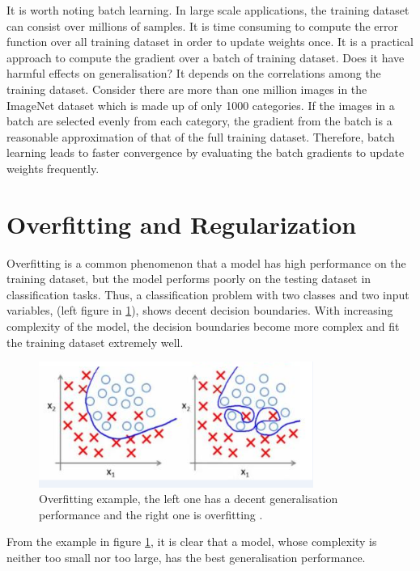 It is worth noting batch learning. In large scale applications, the training dataset can consist over millions of samples. It is time consuming to compute the error function over all training dataset in order to update weights once. It is a practical approach to compute the gradient over a batch of training dataset. Does it have harmful effects on generalisation? It depends on the correlations among the training dataset. Consider there are more than one million images in the ImageNet dataset which is made up of only 1000 categories. If the images in a batch are selected evenly from each category, the gradient from the batch is a reasonable approximation of that of the full training dataset. Therefore, batch learning leads to faster convergence by evaluating the batch gradients to update weights frequently.

\section{Overfitting and Regularization}

Overfitting is a common phenomenon that a model has high performance on the training dataset, but the model performs poorly on the testing dataset in classification tasks. Thus, a classification problem with two classes and two input variables, (left figure in \ref{fig:OverfittingExample}), shows decent decision boundaries. With increasing complexity of the model, the decision boundaries become more complex and fit the training dataset extremely well.
\graphicspath{ {./Figures/} }
\begin{figure}[!htb]
\centering
\includegraphics[width=0.8\textwidth]{overfitting.png}
\caption{\label{fig:OverfittingExample}Overfitting example, the left one has a decent generalisation performance and the right one is overfitting \citep{OverfittingFigure}.}
\end{figure}
From the example in figure \ref{fig:OverfittingExample}, it is clear that a model, whose complexity is neither too small nor too large, has the best generalisation performance. 


